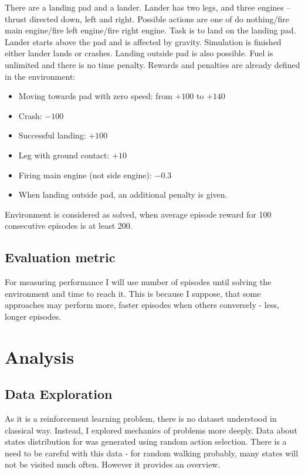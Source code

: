 \documentclass[12pt]{article}
\begin{document}
There are a landing pad and a lander. Lander has two legs, and three engines – thrust directed down, left and right. Possible actions are one of do nothing/fire main engine/fire left engine/fire right engine.  Task is to land on the landing pad.  Lander starts above the pad and is affected by gravity. Simulation is finished either lander lands or crashes. Landing outside pad is also possible. Fuel is unlimited and there is no time penalty.
Rewards and penalties are already defined in the environment:
\begin{itemize}
\item Moving towards pad with zero speed: from $+100$ to $+140$
\item Crash: $-100$
\item Successful landing: $+100$
\item Leg with ground contact: $+10$
\item Firing main engine (not side engine): $-0.3$
\item When landing outside pad, an additional penalty is given.
\end{itemize}

Environment is considered as solved, when average episode reward for 100 consecutive episodes is at least 200.

\subsection{Evaluation metric}

For measuring performance I will use number of episodes until solving the environment and time to reach it. This is because I suppose, that some approaches may perform more, faster episodes when others conversely - less, longer episodes.

\section{Analysis}
\subsection{Data Exploration}

As it is a reinforcement learning problem, there is no dataset understood in classical way. Instead, I explored mechanics of problems more deeply. Data about states distribution for was generated using random action selection. There is a need to be careful with this data - for random walking probably, many states will not be visited much often. However it provides an overview.
\end{document}
